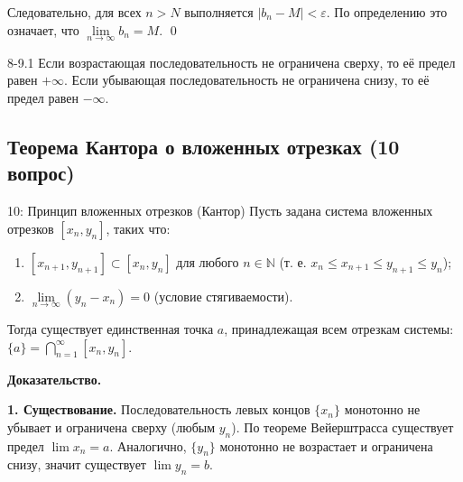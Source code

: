 \documentclass[a4paper,12pt]{article}
\newcommand{\myproof}{\textbf{Доказательство.}\ }
\begin{document}
	Следовательно, для всех $n > N$ выполняется $|b_n - M| < \varepsilon$. 
	По определению это означает, что $\lim\limits_{n \to \infty} b_n = M$. \qed
	
	\begin{center}
	\end{center}
	
	\vspace{0.5cm}
	\begin{remarkbox}{8-9.1}
		Если возрастающая последовательность не ограничена сверху, то её предел равен $+\infty$. Если убывающая последовательность не ограничена снизу, то её предел равен $-\infty$.
	\end{remarkbox}
	
	
	
	
	
	\subsection{Теорема Кантора о вложенных отрезках (10 вопрос)}
	
	\begin{theorembox}{10: Принцип вложенных отрезков (Кантор)}
		Пусть задана система вложенных отрезков $[x_n, y_n]$, таких что:
		\begin{enumerate}
			\item $[x_{n+1}, y_{n+1}] \subset [x_n, y_n]$ для любого $n \in \mathbb{N}$ (т. е. $x_n \le x_{n+1} \le y_{n+1} \le y_n$);
			\item $\lim\limits_{n \to \infty} (y_n - x_n) = 0$ (условие стягиваемости).
		\end{enumerate}
		Тогда существует единственная точка $a$, принадлежащая всем отрезкам системы: $\{a\} = \bigcap_{n=1}^{\infty} [x_n, y_n]$.
	\end{theorembox}
	
	\vspace{0.5cm}	
	\myproof
	
	\textbf{1. Существование.}
	Последовательность левых концов $\{x_n\}$ монотонно не убывает и ограничена сверху (любым $y_n$). По теореме Вейерштрасса существует предел $\lim x_n = a$. Аналогично, $\{y_n\}$ монотонно не возрастает и ограничена снизу, значит существует $\lim y_n = b$.
	
\end{document}
